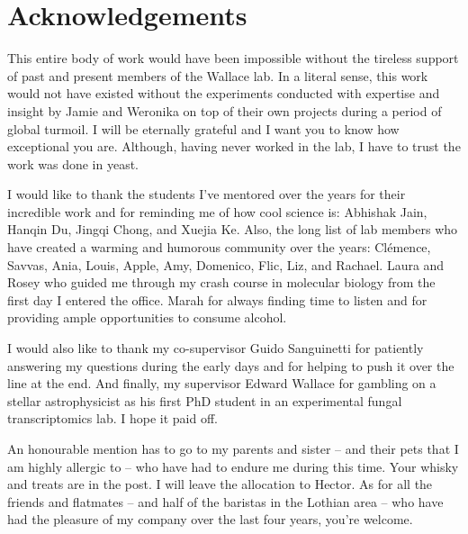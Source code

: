 \documentclass[../main.tex]{subfiles}
\begin{document}
\chapter{Acknowledgements}
This entire body of work would have been impossible without the tireless support of past and present members of the Wallace lab.
In a literal sense, this work would not have existed without the experiments conducted with expertise and insight by Jamie and Weronika on top of their own projects during a period of global turmoil.
I will be eternally grateful and I want you to know how exceptional you are.
Although, having never worked in the lab, I have to trust the work was done in yeast. 

I would like to thank the students I've mentored over the years for their incredible work and for reminding me of how cool science is: Abhishak Jain, Hanqin Du, Jingqi Chong, and Xuejia Ke. 
Also, the long list of lab members who have created a warming and humorous community over the years: Clémence, Savvas, Ania, Louis, Apple, Amy, Domenico, Flic, Liz, and Rachael.
Laura and Rosey who guided me through my crash course in molecular biology from the first day I entered the office.
Marah for always finding time to listen and for providing ample opportunities to consume alcohol.

I would also like to thank my co-supervisor Guido Sanguinetti for patiently answering my questions during the early days and for helping to push it over the line at the end.
And finally, my supervisor Edward Wallace for gambling on a stellar astrophysicist as his first PhD student in an experimental fungal transcriptomics lab. 
I hope it paid off. 

An honourable mention has to go to my parents and sister -- and their pets that I am highly allergic to -- who have had to endure me during this time.
Your whisky and treats are in the post. 
I will leave the allocation to Hector.
As for all the friends and flatmates -- and half of the baristas in the Lothian area -- who have had the pleasure of my company over the last four years, you're welcome.
\end{document}
